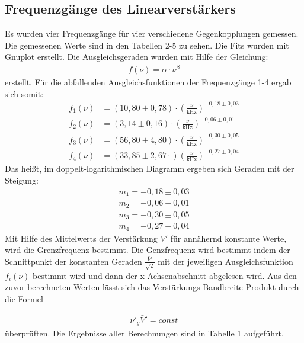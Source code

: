 \documentclass{scrartcl}
\begin{document}
\subsection{Frequenzgänge des Linearverstärkers}
Es wurden vier Frequenzgänge für vier verschiedene Gegenkopplungen gemessen.  Die gemessenen Werte sind in den Tabellen 2-5 zu sehen. Die Fits wurden mit Gnuplot erstellt. Die Ausgleichsgeraden wurden mit Hilfe der Gleichung:
 \begin{align}
 f( \nu)=\alpha \cdot \nu ^\beta
 \end{align}
 erstellt.
Für die abfallenden Ausgleichsfunktionen der Frequenzgänge 1-4 ergab sich somit:
  \begin{align}
f_1(\nu)&=(10,80\pm0,78)\cdot \left(\frac{\nu}{\text{kHz}}\right)^{-0,18\pm0,03}\\
f_2(\nu)&=(3,14\pm0,16)\cdot \left(\frac{\nu}{\text{kHz}}\right)^{-0,06\pm0,01}\\
f_3(\nu)&=(56,80\pm4,80)\cdot \left(\frac{\nu}{\text{kHz}}\right)^{-0,30\pm0,05}\\
f_4(\nu)&=(33,85\pm2,67\cdot)\left(\frac{\nu}{\text{kHz}}\right)^{-0,27\pm 0,04}
 \end{align}
Das heißt, im doppelt-logarithmischen Diagramm ergeben sich Geraden mit der Steigung:
\begin{align}
  m_1=-0,18\pm0,03\\
  m_2=-0,06\pm0,01\\
  m_3=-0,30\pm0,05\\
  m_4=-0,27\pm0,04
\end{align}
Mit Hilfe des Mittelwerts der Verstärkung  $V′$ für annähernd konstante Werte, wird die Grenzfrequenz bestimmt.
Die Genzfrequenz wird bestimmt indem der Schnittpunkt der konstanten Geraden $\frac{\bar{V}'}{\sqrt{2}}$ mit der jeweiligen Ausgleichsfunktion  $f_i(\nu)$ bestimmt wird und dann der x-Achsenabschnitt abgelesen wird. Aus den zuvor berechneten Werten lässt sich das Verstärkungs-Bandbreite-Produkt durch die Formel

   \begin{align}
   \nu'_g \bar{V}' = const
 \end{align}
 überprüften.
Die Ergebnisse aller Berechnungen sind in Tabelle 1 aufgeführt.
\end{document}
